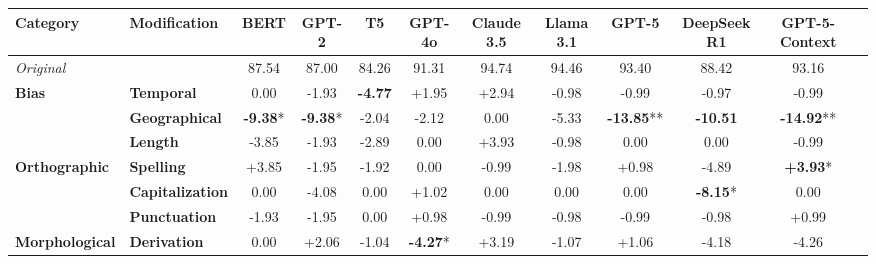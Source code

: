 \begin{table}[h]
\centering
\footnotesize
\begin{adjustbox}{max width=\linewidth}
\begin{tabular}{llcccccccccc}
\hline
Category & Modification & \textbf{BERT} & \textbf{GPT-2} & \textbf{T5} & \textbf{GPT-4o} & \textbf{Claude 3.5} & \textbf{Llama 3.1} & \textbf{GPT-5} & \textbf{DeepSeek R1} & \textbf{GPT-5-Context} \\
\hline
\rowcolor{gray!20}\textit{Original} & & 87.54 & 87.00 & 84.26 & 91.31 & 94.74 & 94.46 & 93.40 & 88.42 & 93.16 \\
\textbf{Bias} & \textbf{Temporal} & \cellcolor{red!0} 0.00 & \cellcolor{red!5} -1.93 & \cellcolor{red!14} \textbf{-4.77} & \cellcolor{green!5} +1.95 & \cellcolor{green!8} +2.94 & \cellcolor{red!2} -0.98 & \cellcolor{red!2} -0.99 & \cellcolor{red!2} -0.97 & \cellcolor{red!2} -0.99 \\
 & \textbf{Geographical} & \cellcolor{red!28} \textbf{-9.38}* & \cellcolor{red!28} \textbf{-9.38}* & \cellcolor{red!6} -2.04 & \cellcolor{red!6} -2.12 & \cellcolor{red!0} 0.00 & \cellcolor{red!15} -5.33 & \cellcolor{red!30} \textbf{-13.85}** & \cellcolor{red!30} \textbf{-10.51} & \cellcolor{red!30} \textbf{-14.92}** \\
 & \textbf{Length} & \cellcolor{red!11} -3.85 & \cellcolor{red!5} -1.93 & \cellcolor{red!8} -2.89 & \cellcolor{red!0} 0.00 & \cellcolor{green!11} +3.93 & \cellcolor{red!2} -0.98 & \cellcolor{red!0} 0.00 & \cellcolor{red!0} 0.00 & \cellcolor{red!2} -0.99 \\
\hline
\textbf{Orthographic} & \textbf{Spelling} & \cellcolor{green!11} +3.85 & \cellcolor{red!5} -1.95 & \cellcolor{red!5} -1.92 & \cellcolor{red!0} 0.00 & \cellcolor{red!2} -0.99 & \cellcolor{red!5} -1.98 & \cellcolor{green!2} +0.98 & \cellcolor{red!14} -4.89 & \cellcolor{green!11} \textbf{+3.93}* \\
 & \textbf{Capitalization} & \cellcolor{red!0} 0.00 & \cellcolor{red!12} -4.08 & \cellcolor{red!0} 0.00 & \cellcolor{green!3} +1.02 & \cellcolor{red!0} 0.00 & \cellcolor{red!0} 0.00 & \cellcolor{red!0} 0.00 & \cellcolor{red!24} \textbf{-8.15}* & \cellcolor{red!0} 0.00 \\
 & \textbf{Punctuation} & \cellcolor{red!5} -1.93 & \cellcolor{red!5} -1.95 & \cellcolor{red!0} 0.00 & \cellcolor{green!2} +0.98 & \cellcolor{red!2} -0.99 & \cellcolor{red!2} -0.98 & \cellcolor{red!2} -0.99 & \cellcolor{red!2} -0.98 & \cellcolor{green!2} +0.99 \\
\hline
\textbf{Morphological} & \textbf{Derivation} & \cellcolor{red!0} 0.00 & \cellcolor{green!6} +2.06 & \cellcolor{red!3} -1.04 & \cellcolor{red!12} \textbf{-4.27}* & \cellcolor{green!9} +3.19 & \cellcolor{red!3} -1.07 & \cellcolor{green!3} +1.06 & \cellcolor{red!12} -4.18 & \cellcolor{red!12} -4.26 \\

\end{tabular}
\end{adjustbox}
\end{table}
